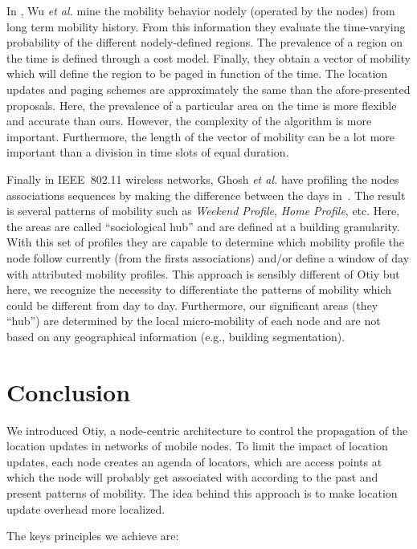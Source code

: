 \documentclass[a4paper]{sig-alternate-10pt}
\begin{document}
In \cite{wu01personal}, Wu \textit{et al.} mine the mobility
behavior nodely (operated by the nodes) from long term
mobility history. From this information they evaluate the
time-varying probability of the different nodely-defined
regions. The prevalence of a region on the time is defined through a
cost model. Finally, they obtain a vector  of mobility
which will define the region to be paged in function of the time.
The location updates and paging schemes are approximately the same
than the afore-presented proposals. Here, the prevalence of a
particular area on the time is more flexible and accurate than ours.
However, the complexity of the algorithm is more important.
Furthermore, the length of the vector of mobility can be a lot more
important than a division in time slots of equal duration.

Finally in IEEE~802.11 wireless networks, Ghosh \textit{et al.} have
profiling the nodes associations sequences by making the difference
between the days in~\cite{ghosh_profiling}. The result is several
patterns of mobility such as \textit{Weekend Profile}, \textit{Home
Profile}, etc. Here, the areas are called ``sociological hub'' and
are defined at a building granularity. With this set of profiles
they are capable to determine which mobility profile the node follow
currently (from the firsts associations) and/or define a window of
day with attributed mobility profiles. This approach is sensibly
different of Otiy but here, we recognize the necessity to
differentiate the patterns of mobility which could be different from
day to day. Furthermore, our significant areas (they ``hub'') are
determined by the local micro-mobility of each node and are
not based on any geographical information (e.g., building
segmentation).


\section{Conclusion}
\label{sec:conclusion}

We introduced Otiy, a node-centric architecture to control the
propagation of the location updates in networks of mobile nodes. To
limit the impact of location updates, each node creates an
agenda of locators, which are access points at which the node will
probably get associated with according to the past and present
patterns of mobility. The idea behind this approach is to make
location update overhead more localized.

The keys principles we achieve are:
\end{document}

